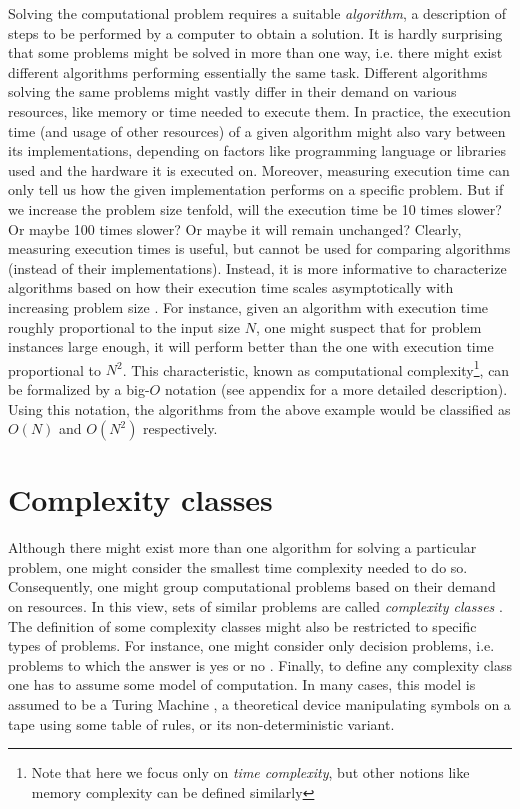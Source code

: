 Solving the computational problem requires a suitable \emph{algorithm}, a
description of steps to be performed by a computer to obtain a solution. It is
hardly surprising that some problems might be solved in more than one way, i.e.
there might exist different algorithms performing essentially the same task.
Different algorithms solving the same problems might vastly differ in their
demand on various resources, like memory or time needed to execute them. In
practice, the execution time (and usage of other resources) of a given
algorithm might also vary between its implementations, depending on factors
like programming language or libraries used and the hardware it is executed on.
Moreover, measuring execution time can only tell us how the given
implementation performs on a specific problem. But if we increase the problem
size tenfold, will the execution time be 10 times slower? Or maybe 100 times
slower? Or maybe it will remain unchanged? Clearly, measuring execution times
is useful, but cannot be used for comparing algorithms (instead of their
implementations). Instead, it is more informative to characterize algorithms
based on how their execution time scales asymptotically with increasing problem
size \cite{arora}. For instance, given an algorithm with execution time roughly
proportional to the input size $N$, one might suspect that for problem
instances large enough, it will perform better than the one with execution time
proportional to $N^{2}$. This characteristic, known as computational
complexity\footnote{Note that here we focus only on \emph{time complexity}, but
  other notions like memory complexity can be defined similarly}, can be
formalized by a big-$O$ notation (see appendix for a more detailed
description). Using this notation, the algorithms from the above example would
be classified as $O(N)$ and $O(N^{2})$ respectively.

\section{Complexity classes}
Although there might exist more than one algorithm for solving a particular
problem, one might consider the smallest time complexity needed to do so.
Consequently, one might group computational problems based on their demand on
resources. In this view, sets of similar problems are called \emph{complexity
  classes} \cite{arora}. The definition of some complexity classes might also be
restricted to specific types of problems. For instance, one might consider only
decision problems, i.e. problems to which the answer is yes or no \cite{arora}.
Finally, to define any complexity class one has to assume some model of
computation. In many cases, this model is assumed to be a Turing Machine
\cite{arora}, a theoretical device manipulating symbols on a tape using some
table of rules, or its non-deterministic variant.

